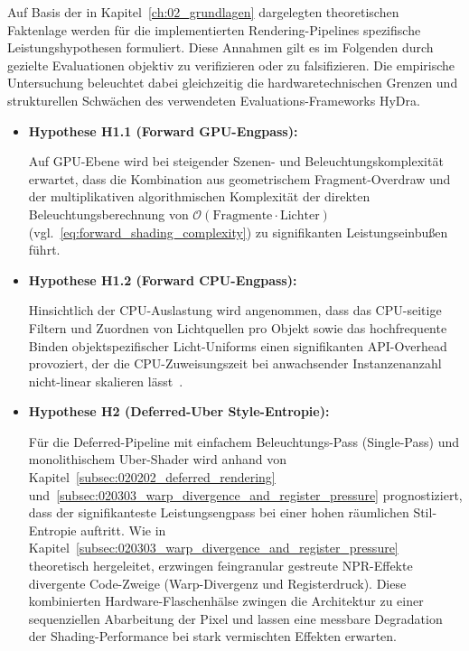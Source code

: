 Auf Basis der in Kapitel~\ref{ch:02_grundlagen} dargelegten theoretischen Faktenlage werden für die implementierten
Rendering-Pipelines spezifische Leistungshypothesen formuliert.
Diese Annahmen gilt es im Folgenden durch gezielte Evaluationen objektiv zu verifizieren oder zu falsifizieren.
Die empirische Untersuchung beleuchtet dabei gleichzeitig die hardwaretechnischen Grenzen und strukturellen Schwächen
des verwendeten Evaluations-Frameworks \ac{HyDra}.

\begin{itemize}
    \item \hypertarget{hyp:H1.1}{\textbf{Hypothese H1.1 (Forward GPU-Engpass):}}
    Auf \ac{GPU}-Ebene wird bei steigender Szenen- und Beleuchtungskomplexität erwartet, dass die Kombination aus
    geometrischem Fragment-Overdraw und der multiplikativen algorithmischen Komplexität der direkten
    Beleuchtungsberechnung von $\mathcal{O}(\text{Fragmente} \cdot \text{Lichter})$ (vgl.~\ref{eq:forward_shading_complexity}) zu
    signifikanten Leistungseinbußen führt.

    \item \hypertarget{hyp:H1.2}{\textbf{Hypothese H1.2 (Forward CPU-Engpass):}}
    Hinsichtlich der \ac{CPU}-Auslastung wird angenommen, dass das \ac{CPU}-seitige Filtern und Zuordnen von
    Lichtquellen pro Objekt sowie das hochfrequente Binden objektspezifischer Licht-Uniforms einen signifikanten
    \ac{API}-Overhead provoziert, der die \ac{CPU}-Zuweisungszeit bei anwachsender Instanzenanzahl nicht-linear
    skalieren lässt~\parencite[vgl.][Abschn.~1]{haradaForwardBringingDeferred2012}.

    \item \hypertarget{hyp:H2}{\textbf{Hypothese H2 (Deferred-Uber Style-Entropie):}}
    Für die Deferred-Pipeline mit einfachem Beleuchtungs-Pass (Single-Pass) und monolithischem Uber-Shader wird anhand
    von Kapitel~\ref{subsec:020202_deferred_rendering} und~\ref{subsec:020303_warp_divergence_and_register_pressure}
    prognostiziert, dass der signifikanteste Leistungsengpass bei einer hohen räumlichen Stil-Entropie auftritt.
    Wie in Kapitel~\ref{subsec:020303_warp_divergence_and_register_pressure} theoretisch hergeleitet, erzwingen
    feingranular gestreute \ac{NPR}-Effekte divergente Code-Zweige (Warp-Divergenz und Registerdruck).
    Diese kombinierten Hardware-Flaschenhälse zwingen die Architektur zu einer sequenziellen Abarbeitung der Pixel
    und lassen eine messbare Degradation der Shading-Performance bei stark vermischten Effekten erwarten.


\end{itemize}
